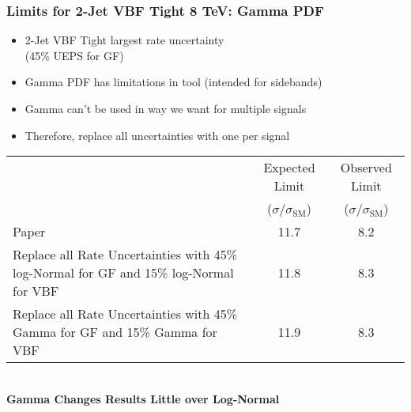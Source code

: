 \documentclass{hugontalk}
\begin{document}
\begin{frame}
\frametitle{Limits for 2-Jet VBF Tight 8 TeV: Gamma PDF}
\begin{itemize}
  \item 2-Jet VBF Tight \jra{} largest rate uncertainty \\ (45\% UEPS for GF)
  \item Gamma PDF has limitations in tool (intended for sidebands)
  \item Gamma can't be used in way we want for multiple signals
  \item Therefore, replace all uncertainties with one per signal
\end{itemize}
\begin{center}
\scriptsize
\begin{tabular}{ | p{4cm} | c | c | }
\hline
 & Expected Limit  & Observed Limit\\
 & ($\sigma/\sigma_\mathrm{SM}$) & ($\sigma/\sigma_\mathrm{SM}$) \\ \hline \hline
Paper & 11.7 & 8.2 \\ \hline
Replace all Rate Uncertainties with 45\% log-Normal for GF and 15\% log-Normal for VBF & 11.8 & 8.3 \\ \hline
Replace all Rate Uncertainties with 45\% Gamma for GF and 15\% Gamma for VBF & 11.9 & 8.3 \\ \hline
\end{tabular}
\\ \normalsize
\vspace{1ex}
\bf Gamma Changes Results Little over Log-Normal
\end{center}
\end{frame}
\end{document}
